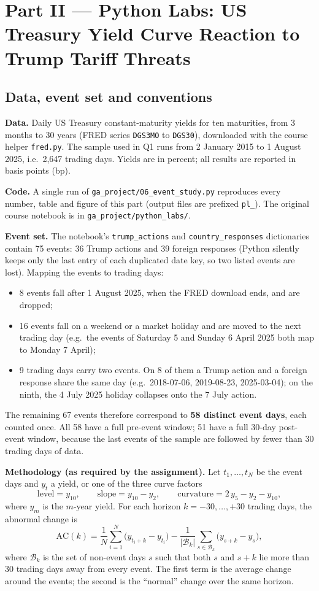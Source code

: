 \documentclass[11pt]{article}
\begin{document}
\section{Part II --- Python Labs: US Treasury Yield Curve Reaction to Trump Tariff Threats}

\subsection*{Data, event set and conventions}

\textbf{Data.} Daily US Treasury constant-maturity yields for ten maturities,
from 3 months to 30 years (FRED series \texttt{DGS3MO} to \texttt{DGS30}),
downloaded with the course helper \texttt{fred.py}. The sample used in Q1 runs from 2 January 2015 to 1 August 2025, i.e.\
2{,}647 trading days. Yields are in percent; all results are reported in basis
points (bp).

\textbf{Code.} A single run of \nolinkurl{ga_project/06_event_study.py}
reproduces every number, table and figure of this part (output files are
prefixed \texttt{pl\_}). The original course notebook is in
\nolinkurl{ga_project/python_labs/}.

\textbf{Event set.} The notebook's \texttt{trump\_actions} and
\texttt{country\_responses} dictionaries contain 75 events: 36 Trump actions
and 39 foreign responses (Python silently keeps only the last entry of each
duplicated date key, so two listed events are lost). Mapping the events to
trading days:
\begin{itemize}[leftmargin=1.2em,nosep]
\item 8 events fall after 1 August 2025, when the FRED download ends, and are
dropped;
\item 16 events fall on a weekend or a market holiday and are moved to the
next trading day (e.g.\ the events of Saturday 5 and Sunday 6 April 2025 both
map to Monday 7 April);
\item 9 trading days carry two events. On 8 of them a Trump action and a
foreign response share the same day (e.g.\ 2018-07-06, 2019-08-23,
2025-03-04); on the ninth, the 4 July 2025 holiday collapses onto the
7 July action.
\end{itemize}
The remaining 67 events therefore correspond to \textbf{58 distinct event
days}, each counted once. All 58 have a full pre-event window; 51 have a full
30-day post-event window, because the last events of the sample are followed
by fewer than 30 trading days of data.

\textbf{Methodology (as required by the assignment).} Let $t_1,\dots,t_N$ be
the event days and $y_t$ a yield, or one of the three curve factors
\[
\text{level}=y_{10},\qquad
\text{slope}=y_{10}-y_{2},\qquad
\text{curvature}=2\,y_{5}-y_{2}-y_{10},
\]
where $y_m$ is the $m$-year yield. For each horizon $k=-30,\dots,+30$ trading
days, the abnormal change is
\[
\mathrm{AC}(k)
=\frac{1}{N}\sum_{i=1}^{N}\bigl(y_{t_i+k}-y_{t_i}\bigr)
-\frac{1}{|\mathcal{B}_k|}\sum_{s\in\mathcal{B}_k}\bigl(y_{s+k}-y_{s}\bigr),
\]
where $\mathcal{B}_k$ is the set of non-event days $s$ such that both $s$ and
$s+k$ lie more than 30 trading days away from every event. The first term is
the average change around the events; the second is the ``normal'' change
over the same horizon.
\end{document}
